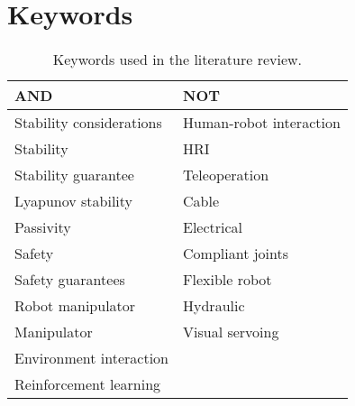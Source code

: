 \chapter{Keywords}
\label{chapter:keywords}

\setlength\extrarowheight{4pt}
\begin{table}[htb]
    \centering
    \caption{Keywords used in the literature review.}
    \label{tab:keywords}
    \begin{tabularx}{0.8\textwidth}{XX}
        \toprule
        AND & NOT \\
        \midrule
        Stability considerations & Human-robot interaction \\
        Stability & HRI \\
        Stability guarantee & Teleoperation \\
        Lyapunov stability & Cable \\
        Passivity & Electrical \\
        Safety & Compliant joints \\
        Safety guarantees & Flexible robot \\
        Robot manipulator & Hydraulic \\
        Manipulator & Visual servoing \\
        Environment interaction &  \\
        Reinforcement learning & \\
        \bottomrule
    \end{tabularx}
\end{table}
